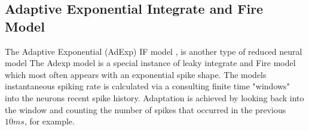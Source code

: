 \subsection{Adaptive Exponential Integrate and Fire Model}

The Adaptive Exponential (AdExp) IF model \cite{brette2005adaptive}, is another type of reduced neural model
The Adexp model is a special instance of leaky integrate and Fire model which most often appears with an exponential spike shape.
The models instantaneous spiking rate is calculated via a consulting finite time "windows" into the neurons recent spike history.
Adaptation is achieved by looking back into the window and counting the number of spikes that occurred in the previous $10ms$, for example. 
